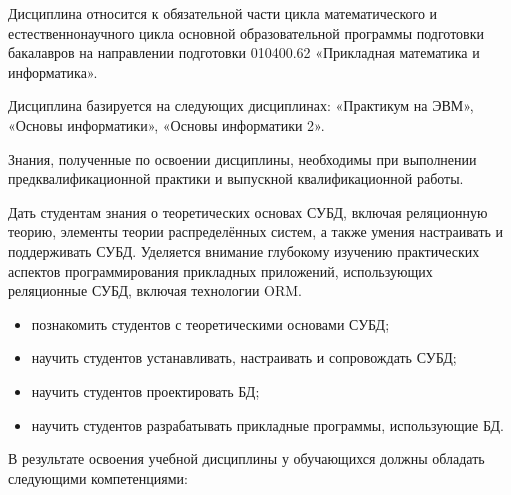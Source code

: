 \documentclass[a4paper]{article}
\begin{document}
\renewcommand{\CourseName}{Базы данных}
\renewcommand{\CourseAuthor}{старший преподаватель кафедры информатики, математического и компьютерного моделирования А.~С.~Кленин}
\renewcommand{\CourseYear}{2}
\renewcommand{\CourseSemester}{4}
\renewcommand{\CourseLectures}{36}

\renewcommand{\CourseTotalAuditory}{70}
\renewcommand{\CourseHomework}{50}

\renewcommand{\CourseReferatsNumber}{1}

\renewcommand{\CoursePassfailSemester}{3}
\renewcommand{\CourseExamSemester}{2}

\CoursePlanTitlePage
\begin{CoursePlanTitlePageReverse}
  \CourseUpdateRecord
  \CourseUpdateRecord
\end{CoursePlanTitlePageReverse}

\CourseAnnotationSection

Дисциплина относится к обязательной части цикла математического и естественнонаучного цикла
основной образовательной программы подготовки бакалавров на направлении подготовки 010400.62 «Прикладная математика и информатика».

Дисциплина базируется на следующих дисциплинах: «Практикум на ЭВМ», «Основы информатики», «Основы информатики 2».

Знания, полученные по освоении дисциплины, необходимы при выполнении предквалификационной практики и выпускной квалификационной работы.

\CourseGoal

Дать студентам знания о теоретических основах СУБД, включая реляционную теорию, элементы теории распределённых систем,
а также умения настраивать и поддерживать СУБД.
Уделяется внимание глубокому изучению практических аспектов программирования прикладных приложений,
использующих реляционные СУБД, включая технологии ORM.

\CourseTasks
\begin{itemize}
  \item познакомить студентов с теоретическими основами СУБД;
  \item научить студентов устанавливать, настраивать и сопровождать СУБД;
  \item научить студентов проектировать БД;
  \item научить студентов разрабатывать прикладные программы, использующие БД.
\end{itemize}

В результате освоения учебной дисциплины у обучающихся должны обладать следующими компетенциями:
\end{document}
